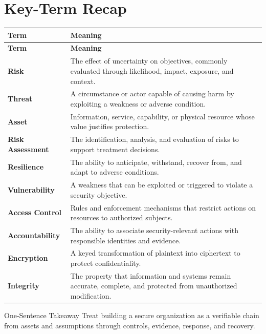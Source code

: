 \documentclass[11pt,letterpaper]{article}
\begin{document}
\section*{Key-Term Recap}
\begin{longtable}{>{\RaggedRight\arraybackslash}p{}>{\RaggedRight\arraybackslash}p{}}
\toprule\rowcolor{Navy}\color{white}\textbf{Term} & \color{white}\textbf{Meaning}\\\midrule
\endfirsthead
\toprule\rowcolor{Navy}\color{white}\textbf{Term} & \color{white}\textbf{Meaning}\\\midrule
\endhead
\textbf{Risk} & The effect of uncertainty on objectives, commonly evaluated through likelihood, impact, exposure, and context. \\\midrule
\textbf{Threat} & A circumstance or actor capable of causing harm by exploiting a weakness or adverse condition. \\\midrule
\textbf{Asset} & Information, service, capability, or physical resource whose value justifies protection. \\\midrule
\textbf{Risk Assessment} & The identification, analysis, and evaluation of risks to support treatment decisions. \\\midrule
\textbf{Resilience} & The ability to anticipate, withstand, recover from, and adapt to adverse conditions. \\\midrule
\textbf{Vulnerability} & A weakness that can be exploited or triggered to violate a security objective. \\\midrule
\textbf{Access Control} & Rules and enforcement mechanisms that restrict actions on resources to authorized subjects. \\\midrule
\textbf{Accountability} & The ability to associate security-relevant actions with responsible identities and evidence. \\\midrule
\textbf{Encryption} & A keyed transformation of plaintext into ciphertext to protect confidentiality. \\\midrule
\textbf{Integrity} & The property that information and systems remain accurate, complete, and protected from unauthorized modification. \\\midrule
\bottomrule
\end{longtable}
\begin{CornellExamBox}{One-Sentence Takeaway}
Treat building a secure organization as a verifiable chain from assets and assumptions through controls, evidence, response, and recovery.
\end{CornellExamBox}
\end{document}
